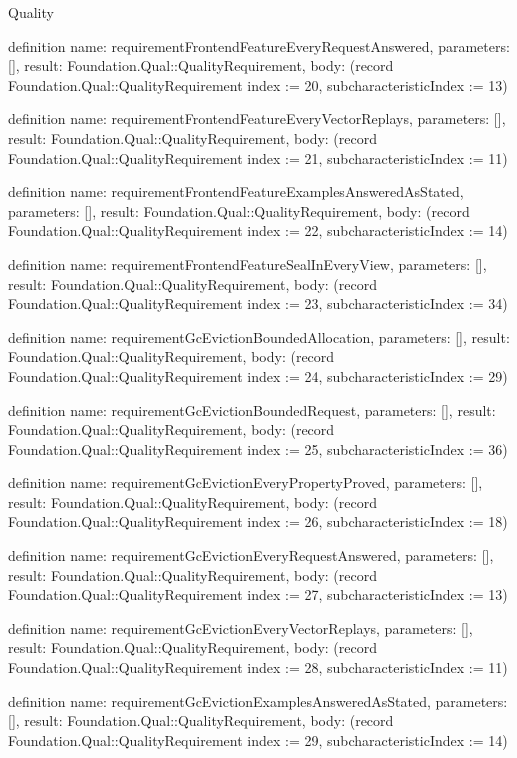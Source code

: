 \begin{lexlean}{Quality}
\begin{semanticmodule}
definition{
  name: requirementFrontendFeatureEveryRequestAnswered,
  parameters: [],
  result: Foundation.Qual::QualityRequirement,
  body: (record Foundation.Qual::QualityRequirement {index := 20, subcharacteristicIndex := 13})
}

definition{
  name: requirementFrontendFeatureEveryVectorReplays,
  parameters: [],
  result: Foundation.Qual::QualityRequirement,
  body: (record Foundation.Qual::QualityRequirement {index := 21, subcharacteristicIndex := 11})
}

definition{
  name: requirementFrontendFeatureExamplesAnsweredAsStated,
  parameters: [],
  result: Foundation.Qual::QualityRequirement,
  body: (record Foundation.Qual::QualityRequirement {index := 22, subcharacteristicIndex := 14})
}

definition{
  name: requirementFrontendFeatureSealInEveryView,
  parameters: [],
  result: Foundation.Qual::QualityRequirement,
  body: (record Foundation.Qual::QualityRequirement {index := 23, subcharacteristicIndex := 34})
}

definition{
  name: requirementGcEvictionBoundedAllocation,
  parameters: [],
  result: Foundation.Qual::QualityRequirement,
  body: (record Foundation.Qual::QualityRequirement {index := 24, subcharacteristicIndex := 29})
}

definition{
  name: requirementGcEvictionBoundedRequest,
  parameters: [],
  result: Foundation.Qual::QualityRequirement,
  body: (record Foundation.Qual::QualityRequirement {index := 25, subcharacteristicIndex := 36})
}

definition{
  name: requirementGcEvictionEveryPropertyProved,
  parameters: [],
  result: Foundation.Qual::QualityRequirement,
  body: (record Foundation.Qual::QualityRequirement {index := 26, subcharacteristicIndex := 18})
}

definition{
  name: requirementGcEvictionEveryRequestAnswered,
  parameters: [],
  result: Foundation.Qual::QualityRequirement,
  body: (record Foundation.Qual::QualityRequirement {index := 27, subcharacteristicIndex := 13})
}

definition{
  name: requirementGcEvictionEveryVectorReplays,
  parameters: [],
  result: Foundation.Qual::QualityRequirement,
  body: (record Foundation.Qual::QualityRequirement {index := 28, subcharacteristicIndex := 11})
}

definition{
  name: requirementGcEvictionExamplesAnsweredAsStated,
  parameters: [],
  result: Foundation.Qual::QualityRequirement,
  body: (record Foundation.Qual::QualityRequirement {index := 29, subcharacteristicIndex := 14})
}


\end{semanticmodule}
\end{lexlean}
